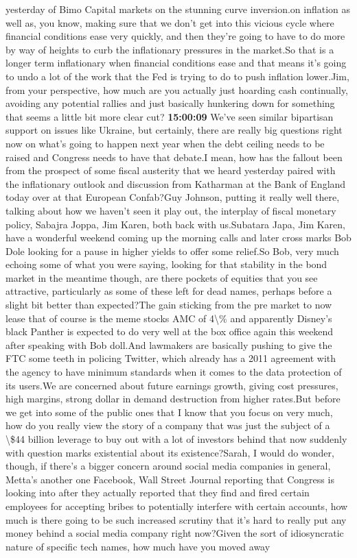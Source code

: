 \documentclass{article}%
\begin{document}
yesterday of Bimo Capital markets on the stunning curve inversion.on inflation as well as, you know, making sure that we don't get into this vicious cycle where financial conditions ease very quickly, and then they're going to have to do more by way of heights to curb the inflationary pressures in the market.So that is a longer term inflationary when financial conditions ease and that means it's going to undo a lot of the work that the Fed is trying to do to push inflation lower.Jim, from your perspective, how much are you actually just hoarding cash continually, avoiding any potential rallies and just basically hunkering down for something that seems a little bit more clear cut?%
\textbf{15:00:09}%
\newline%
We've seen similar bipartisan support on issues like Ukraine, but certainly, there are really big questions right now on what's going to happen next year when the debt ceiling needs to be raised and Congress needs to have that debate.I mean, how has the fallout been from the prospect of some fiscal austerity that we heard yesterday paired with the inflationary outlook and discussion from Katharman at the Bank of England today over at that European Confab?Guy Johnson, putting it really well there, talking about how we haven't seen it play out, the interplay of fiscal monetary policy, Sabajra Joppa, Jim Karen, both back with us.Subatara Japa, Jim Karen, have a wonderful weekend coming up the morning calls and later cross marks Bob Dole looking for a pause in higher yields to offer some relief.So Bob, very much echoing some of what you were saying, looking for that stability in the bond market in the meantime though, are there pockets of equities that you see attractive, particularly as some of these left for dead names, perhaps before a slight bit better than expected?The gain sticking from the pre market to now lease that of course is the meme stocks AMC of 4\textbackslash{}\% and apparently Disney's black Panther is expected to do very well at the box office again this weekend after speaking with Bob doll.And lawmakers are basically pushing to give the FTC some teeth in policing Twitter, which already has a 2011 agreement with the agency to have minimum standards when it comes to the data protection of its users.We are concerned about future earnings growth, giving cost pressures, high margins, strong dollar in demand destruction from higher rates.But before we get into some of the public ones that I know that you focus on very much, how do you really view the story of a company that was just the subject of a \textbackslash{}\$44 billion leverage to buy out with a lot of investors behind that now suddenly with question marks existential about its existence?Sarah, I would do wonder, though, if there's a bigger concern around social media companies in general, Metta's another one Facebook, Wall Street Journal reporting that Congress is looking into after they actually reported that they find and fired certain employees for accepting bribes to potentially interfere with certain accounts, how much is there going to be such increased scrutiny that it's hard to really put any money behind a social media company right now?Given the sort of idiosyncratic nature of specific tech names, how much have you moved away 
\end{document}

